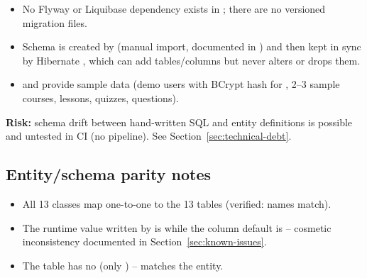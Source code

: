 \begin{itemize}
    \item No Flyway or Liquibase dependency exists in ; there are no versioned migration files.
    \item Schema is created by  (manual import, documented in ) and then kept in sync by Hibernate , which can add tables/columns but never alters or drops them.
    \item {} and  provide  sample data (demo users with BCrypt hash for , 2--3 sample courses, lessons, quizzes, questions).
\end{itemize}
\noindent \textbf{Risk:} schema drift between hand-written SQL and entity definitions is possible and untested in CI (no pipeline). See Section~\ref{sec:technical-debt}.

\subsection{Entity/schema parity notes}

\begin{itemize}
    \item All 13  classes map one-to-one to the 13 tables (verified:  names match).
    \item The runtime  value written by  is  while the column default is  -- cosmetic inconsistency documented in Section~\ref{sec:known-issues}.
    \item The  table has no  (only ) -- matches the entity.
\end{itemize}
